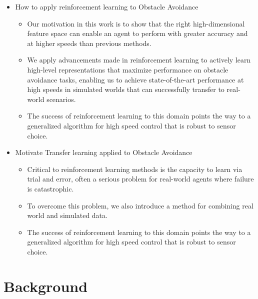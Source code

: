 \documentclass[paper=a4, fontsize=11pt]{scrartcl} %
\begin{document}
\begin{itemize}
	\item How to apply reinforcement learning to Obstacle Avoidance
	\begin{itemize}	
		\item Our motivation in this work is to show that the right high-dimensional feature space can enable an agent to perform with greater accuracy and at higher speeds than previous methods.
		\item We apply advancements made in reinforcement learning to actively learn high-level representations that maximize performance on obstacle avoidance tasks, enabling us to achieve state-of-the-art performance at high speeds in simulated worlds that can successfully transfer to real-world scenarios.
		\item The success of reinforcement learning to this domain points the way to a generalized algorithm for high speed control that is robust to sensor choice.
	\end{itemize}

	\item Motivate Transfer learning applied to Obstacle Avoidance
	\begin{itemize}
		\item Critical to reinforcement learning methods is the capacity to learn via trial and error, often a serious problem for real-world agents where failure is catastrophic.
		\item To overcome this problem, we also introduce a method for combining real world and simulated data.
		\item The success of reinforcement learning to this domain points the way to a generalized algorithm for high speed control that is robust to sensor choice.
	\end{itemize}

\end{itemize}

\section{Background}
\end{document}
